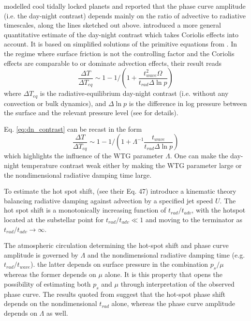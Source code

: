 \citet{koll2015deciphering} modelled cool tidally locked planets and reported that the phase curve amplitude (i.e. the day-night contrast) depends mainly on the ratio of advective to radiative timescales, along the lines sketched out above.  \citet{zhang2016effects} introduced a more general quantitative estimate of the day-night contrast which takes Coriolis effects into account. It is based on simplified solutions of the primitive equations from \citet{komacek2016atmospheric}.  In the regime where surface friction is not the controlling factor and the Coriolis effects are comparable to or dominate advection effects, their result reads
\begin{equation}\label{eq:dn_contrast}
 \frac{\Delta T}{\Delta T_{eq}} \sim 1 - 1 / (1 +\frac{t_{wave}^{2} \Omega}{t_{rad}\Delta \ln p})
\end{equation}
where $\Delta T_{eq}$ is the radiative-equilibrium day-night contrast (i.e. without any convection or bulk dynamics), and $\Delta \ln p$ is the difference in log pressure between the surface and the relevant pressure level (see \citet{zhang2016effects} for details).

Eq. \ref{eq:dn_contrast} can be recast in the form
\begin{equation}\label{eq:dn_contrast1}
 \frac{\Delta T}{\Delta T_{eq}} \sim 1 - 1 / (1 + \Lambda^{-1}\frac{t_{wave}}{t_{rad}\Delta \ln p})
\end{equation}
which highlights the influence of the WTG parameter $\Lambda$. One can make the day-night temperature contrast weak either by making the WTG parameter large or the nondimensional radiative damping time large.

To estimate the hot spot shift, \citet{zhang2016effects} (see their Eq. 47)  introduce a kinematic theory balancing radiative damping against advection by a specified jet speed $U$.  The hot spot shift is a monotonically increasing function of $t_{rad}/t_{adv}$, with the hotspot located at the substellar point for $t_{rad}/t_{adv} \ll 1$ and moving to the terminator as $t_{rad}/t_{adv} \rightarrow \infty$.

The atmospheric circulation determining the hot-spot shift and phase curve amplitude is governed by $\Lambda$ and the nondimensional radiative damping time (e.g. $t_{rad}/t_{wave}$). the latter depends on surface pressure in the combination $p_s/\mu$ whereas the former depends on $\mu$ alone. It is this property that opens the possibility of estimating both $p_s$ and $\mu$ through interpretation of the observed phase curve. The results quoted from \citet{zhang2016effects} suggest that the hot-spot phase shift depends on the nondimensional $t_{rad}$ alone, whereas the phase curve amplitude depends on $\Lambda$ as well.

